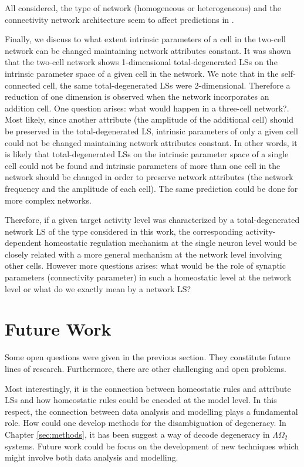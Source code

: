 All considered, the type of network (homogeneous or heterogeneous) and the connectivity network architecture seem to affect predictions in  \cite{Oly}.

Finally, we discuss to what extent intrinsic parameters of a cell in the two-cell network can be changed maintaining network attributes constant. It was shown that the two-cell network shows 1-dimensional total-degenerated LSs on the intrinsic parameter space of a given cell in the network. We note that in the self-connected cell, the same total-degenerated LSs were 2-dimensional. Therefore a reduction of one dimension is observed when the network incorporates an addition cell. One question arises: what would happen in a three-cell network?. Most likely, since another attribute (the amplitude of the additional cell) should be preserved in the total-degenerated LS, intrinsic parameters of only a given cell could not be changed maintaining network attributes constant. In other words, it is likely that total-degenerated LSs on the intrinsic parameter space of a single cell could not be found and intrinsic parameters of more than one cell in the network should be changed in order to preserve network attributes (the network frequency and the amplitude of each cell). The same prediction could be done for more complex networks.

Therefore, if a given target activity level was characterized by a total-degenerated network LS of the type considered in this work, the corresponding activity-dependent homeostatic regulation mechanism at the single neuron level would be closely related with a more general mechanism at the network level involving other cells. However more questions arises: what would be the role of synaptic parameters (connectivity parameter) in such a homeostatic level at the network level or what do we exactly mean by a network LS?

\section{Future Work}
Some open questions were given in the previous section. They constitute future lines of research. Furthermore, there are other challenging and open problems.

Most interestingly, it is the connection between homeostatic rules and attribute LSs and how homeostatic rules could be encoded at the model level. In this respect, the connection between data analysis and modelling plays a fundamental role. How could one develop methods for the disambiguation of degeneracy. In Chapter \ref{sec:methods}, it has been suggest a way of decode degeneracy in $\Lambda \Omega_{2}$ systems. Future work could be focus on the development of new techniques which might involve both data analysis and modelling.

